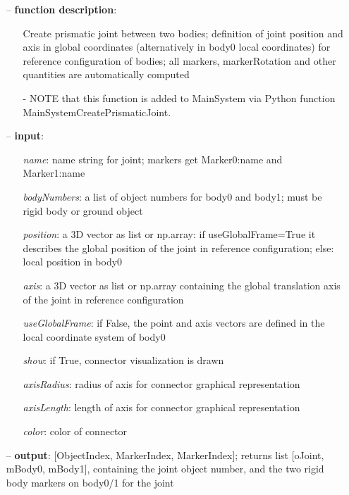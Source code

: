 \begin{itemize}[leftmargin=0.7cm]
\item[--]
{\bf function description}: \vspace{-6pt}
\begin{itemize}[leftmargin=1.2cm]
\setlength{\itemindent}{-0.7cm}
\item[]Create prismatic joint between two bodies; definition of joint position and axis in global coordinates (alternatively in body0 local coordinates) for reference configuration of bodies; all markers, markerRotation and other quantities are automatically computed
\item[]- NOTE that this function is added to MainSystem via Python function MainSystemCreatePrismaticJoint.
\end{itemize}
\item[--]
{\bf input}: \vspace{-6pt}
\begin{itemize}[leftmargin=1.2cm]
\setlength{\itemindent}{-0.7cm}
\item[]{\it name}: name string for joint; markers get Marker0:name and Marker1:name
\item[]{\it bodyNumbers}: a list of object numbers for body0 and body1; must be rigid body or ground object
\item[]{\it position}: a 3D vector as list or np.array: if useGlobalFrame=True it describes the global position of the joint in reference configuration; else: local position in body0
\item[]{\it axis}: a 3D vector as list or np.array containing the global translation axis of the joint in reference configuration
\item[]{\it useGlobalFrame}: if False, the point and axis vectors are defined in the local coordinate system of body0
\item[]{\it show}: if True, connector visualization is drawn
\item[]{\it axisRadius}: radius of axis for connector graphical representation
\item[]{\it axisLength}: length of axis for connector graphical representation
\item[]{\it color}: color of connector
\end{itemize}
\item[--]
{\bf output}: [ObjectIndex, MarkerIndex, MarkerIndex]; returns list [oJoint, mBody0, mBody1], containing the joint object number, and the two rigid body markers on body0/1 for the joint
\vspace{12pt}\end{itemize}
%

